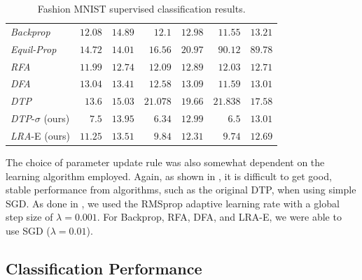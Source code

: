 \documentclass[letterpaper]{article} %
\begin{document}
\begin{table}[!t]
\begin{tabular}{l|r|r||r|r||r|r}
\hline
\textit{Backprop} & $12.08$ & $14.89$ & $12.1$ & $12.98$ & $11.55$ & $13.21$\tabularnewline
\textit{Equil-Prop} & $14.72$ & $14.01$ & $16.56$ & $20.97$ & $90.12$ & $89.78$\tabularnewline
\textit{RFA} & $11.99$ & $12.74$ & $12.09$ & $12.89$ & $12.03$ & $12.71$\tabularnewline
\textit{DFA} & $13.04$ & $13.41$ & $12.58$ & $13.09$ & $11.59$ & $13.01$\tabularnewline
\textit{DTP} & $13.6$ & $15.03$ & $21.078$ & $19.66$ & $21.838$ & $17.58$\tabularnewline
\textit{DTP}-$\sigma$ (ours) & $7.5$ & $13.95$ & $6.34$ & $12.99$ & $6.5$ & $13.01$\tabularnewline
\textit{LRA}-E (ours) & $11.25$ & $13.51$ & $9.84$ & $12.31$ & $9.74$ & $12.69$ \tabularnewline
\hline
\end{tabular}
\vspace{-0.1cm}
\caption{Fashion MNIST supervised classification results.}
\label{fmnist_results}
\end{table}

The choice of parameter update rule was also somewhat dependent on the learning algorithm employed. Again, as shown in \cite{ororbia2018conducting}, it is difficult to get good, stable performance from algorithms, such as the original DTP, when using simple SGD. As done in \cite{lee2015targetprop}, we used the RMSprop \cite{tieleman2012rmsprop} adaptive learning rate with a global step size of $\lambda = 0.001$. For Backprop, RFA, DFA, and LRA-E, we were able to use SGD ($\lambda = 0.01$).

\subsection{Classification Performance}
\label{sec:supervised}
\end{document}
